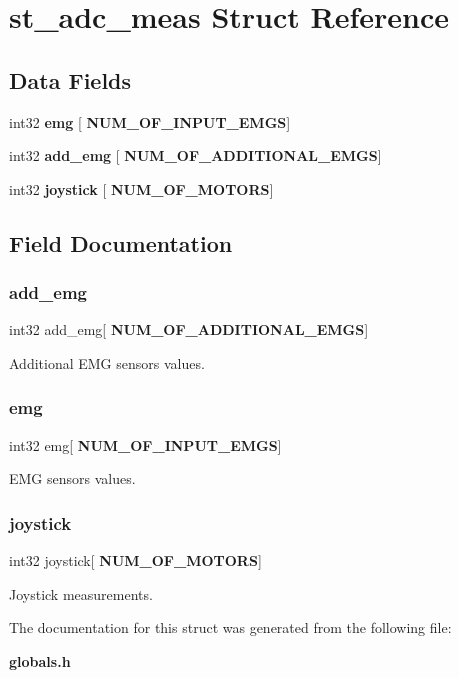 \section{st\+\_\+adc\+\_\+meas Struct Reference}
\label{structst__adc__meas}
\subsection*{Data Fields}
\begin{DoxyCompactItemize}
\item 
int32 \textbf{ emg} [\textbf{ N\+U\+M\+\_\+\+O\+F\+\_\+\+I\+N\+P\+U\+T\+\_\+\+E\+M\+GS}]
\item 
int32 \textbf{ add\+\_\+emg} [\textbf{ N\+U\+M\+\_\+\+O\+F\+\_\+\+A\+D\+D\+I\+T\+I\+O\+N\+A\+L\+\_\+\+E\+M\+GS}]
\item 
int32 \textbf{ joystick} [\textbf{ N\+U\+M\+\_\+\+O\+F\+\_\+\+M\+O\+T\+O\+RS}]
\end{DoxyCompactItemize}


\subsection{Field Documentation}
\mbox{\label{structst__adc__meas_aae2276f2b05661a37072d1b95a17774f}} 
\subsubsection{add\+\_\+emg}
{\footnotesize\ttfamily int32 add\+\_\+emg[\textbf{ N\+U\+M\+\_\+\+O\+F\+\_\+\+A\+D\+D\+I\+T\+I\+O\+N\+A\+L\+\_\+\+E\+M\+GS}]}

Additional E\+MG sensors values. \mbox{\label{structst__adc__meas_ae0da72aee09f1465400d8af30b55c1b1}} 
\subsubsection{emg}
{\footnotesize\ttfamily int32 emg[\textbf{ N\+U\+M\+\_\+\+O\+F\+\_\+\+I\+N\+P\+U\+T\+\_\+\+E\+M\+GS}]}

E\+MG sensors values. \mbox{\label{structst__adc__meas_a83286bdeeb6c218e012edc6ae9030aed}} 
\subsubsection{joystick}
{\footnotesize\ttfamily int32 joystick[\textbf{ N\+U\+M\+\_\+\+O\+F\+\_\+\+M\+O\+T\+O\+RS}]}

Joystick measurements. 

The documentation for this struct was generated from the following file\+:\begin{DoxyCompactItemize}
\item 
\textbf{ globals.\+h}\end{DoxyCompactItemize}

